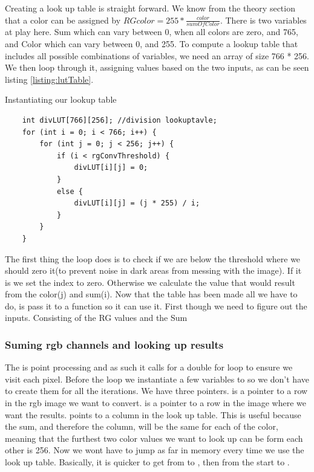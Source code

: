 Creating a look up table is straight forward. We know from the theory section that a color can be assigned by $RGcolor = 255 * \frac{color}{sumOfColor}$. There is two variables at play here. Sum which can vary between 0, when all colors are zero, and 765, and Color which can vary between 0, and 255. To compute a lookup table  that includes all possible combinations of variables, we need an array of size 766 * 256. We then loop through it, assigning values based on the two inputs, as can be seen listing \ref{listing:lutTable}.\\
\begin{listing}[H]
\caption{Instantiating our lookup table}
\label{listing:lutTable}
\begin{verbatim}
	int divLUT[766][256]; //division lookuptavle;
	for (int i = 0; i < 766; i++) {
		for (int j = 0; j < 256; j++) {
			if (i < rgConvThreshold) { 
				divLUT[i][j] = 0;
			}
			else {
				divLUT[i][j] = (j * 255) / i;
			}
		}
	}
\end{verbatim}
\end{listing}
The first thing the loop does is to check if we are below the threshold where we should zero it(to prevent noise in dark areas from messing with the image). If it is we set the index to zero. Otherwise we calculate the value that would result from the color(j) and sum(i).
Now that the table has been made all we have to do, is pass it to a function so it can use it. First though we need to figure out the inputs. Consisting of the RG values and the Sum 

\subsubsection{Suming rgb channels and looking up results}
The is point processing and as such it calls for a double for loop to ensure we visit each pixel. Before the loop we instantiate a few variables to so we don't have to create them for all the iterations. We have three pointers.  is a pointer to a row in the rgb image we want to convert.  is a pointer to a row in the image where we want the results.  points to a column in the look up table. This is useful because the sum, and therefore the column, will be the same for each of the color, meaning that the furthest two color values we want to look up can be form each other is 256. Now we wont have to jump as far in memory every time we use the look up table. Basically, it is quicker to get from  to , then from the start to . 

